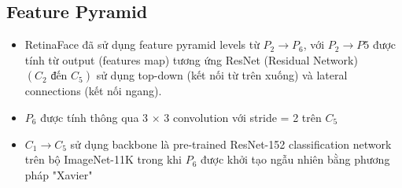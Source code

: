 \documentclass[12pt, a4paper, oneside]{book}
\theoremstyle{plain}
\numberwithin{equation}{chapter} \DeclareMathOperator{\Var}{var}
\begin{document}
\subsection{Feature Pyramid}
\begin{itemize}
    \item[--] RetinaFace đã sử dụng feature pyramid levels từ \(P_2 \to P_6\), với \(P_2 \to P5\) được tính từ output (features map) tương ứng ResNet (Residual Network) \((C_2 \text{ đến } C_5)\) sử dụng top-down (kết nối từ trên xuống) và lateral connections (kết nối ngang).
    \item[--] \(P_6\) được tính thông qua 3 \(\times\) 3 convolution với stride = 2 trên \(C_5\)   
    \item[--] \(C_1 \to C_5\) sử dụng backbone là pre-trained ResNet-152 \cite{he2016deep} classification network trên bộ ImageNet-11K trong khi \(P_6\) được khởi tạo ngẫu nhiên bằng phương pháp "Xavier" \cite{glorot2010understanding}
\end{itemize}
\end{document}
